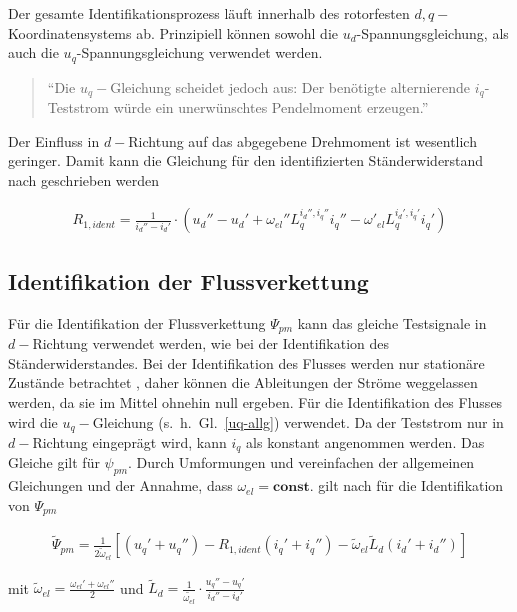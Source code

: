 \documentclass[conference,twocolumn]{IEEEtran}
\begin{document}
Der gesamte Identifikationsprozess läuft innerhalb des rotorfesten $d, q-$Koordinatensystems ab.
Prinzipiell können sowohl die $u_d$-Spannungsgleichung, als auch die $u_q$-Spannungsgleichung verwendet werden.

\begin{quote}
\enquote{Die $u_q-$Gleichung scheidet jedoch aus: Der benötigte alternierende $i_q$-Teststrom würde ein unerwünschtes Pendelmoment erzeugen.}\autocite[S.~148]{Kellner2012}
\end{quote}

Der Einfluss in $d-$Richtung auf das abgegebene Drehmoment ist wesentlich geringer.
Damit kann die Gleichung für den identifizierten Ständerwiderstand nach \textcite{Kellner2012} geschrieben werden

\begin{align}
R_{1,ident} = \frac{1}{i_d''-i_d'} \cdot \left( u_d'' - u_d' + \omega_{el}'' L_q^{i_d'',i_q''}i_q'' - \omega'_{el}L_q^{i_d',i_q'}i_q' \right)
\end{align}

\subsection{Identifikation der Flussverkettung}\label{sec:ident-fluss}

Für die Identifikation der Flussverkettung $\Psi_{pm}$ kann das gleiche Testsignale in $d-$Richtung verwendet werden, wie bei der Identifikation des Ständerwiderstandes.
Bei der Identifikation des Flusses werden nur stationäre Zustände betrachtet \autocite{Kellner2012}, daher können die Ableitungen der Ströme weggelassen werden, da sie im Mittel ohnehin null ergeben.
Für die Identifikation des Flusses wird die $u_q-$Gleichung (s.~h.~Gl.~\ref{uq-allg}) verwendet.
Da der Teststrom nur in $d-$Richtung eingeprägt wird, kann $i_q$ als konstant angenommen werden.
Das Gleiche gilt für $\psi_{pm}$.
Durch Umformungen und vereinfachen der allgemeinen Gleichungen und der Annahme, dass $\omega_{el}=\textbf{const.}$ gilt nach \textcite{Kellner2012} für die Identifikation von $\Psi_{pm}$

\begin{align}
\tilde{\Psi}_{pm} = \frac{1}{2\tilde{\omega}_{el}} \left[ (u_q' + u_q'') - R_{1,ident}(i_q' + i_q'')- \tilde{\omega}_{el}\tilde{L}_d(i_d' + i_d'') \right]
\end{align}

mit $\tilde{\omega}_{el}=\frac{\omega_{el}'+\omega_{el}''}{2}$ und $\tilde{L}_d = \frac{1}{\tilde{\omega_{el}}}\cdot \frac{u_q'' - u_q'}{i_d''-i_d'}$
\end{document}
